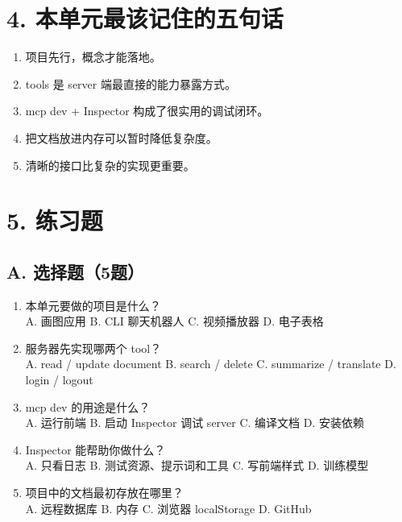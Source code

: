 \documentclass[UTF8,a4paper,11pt]{ctexart}
\begin{document}
\section*{4. 本单元最该记住的五句话}
\begin{enumerate}
  \item 项目先行，概念才能落地。
  \item tools 是 server 端最直接的能力暴露方式。
  \item mcp dev + Inspector 构成了很实用的调试闭环。
  \item 把文档放进内存可以暂时降低复杂度。
  \item 清晰的接口比复杂的实现更重要。
\end{enumerate}

\section*{5. 练习题}
\subsection*{A. 选择题（5题）}
\begin{enumerate}
  \item 本单元要做的项目是什么？\\
  A. 画图应用 \quad B. CLI 聊天机器人 \quad C. 视频播放器 \quad D. 电子表格

  \item 服务器先实现哪两个 tool？\\
  A. read / update document \quad B. search / delete \quad C. summarize / translate \quad D. login / logout

  \item mcp dev 的用途是什么？\\
  A. 运行前端 \quad B. 启动 Inspector 调试 server \quad C. 编译文档 \quad D. 安装依赖

  \item Inspector 能帮助你做什么？\\
  A. 只看日志 \quad B. 测试资源、提示词和工具 \quad C. 写前端样式 \quad D. 训练模型

  \item 项目中的文档最初存放在哪里？\\
  A. 远程数据库 \quad B. 内存 \quad C. 浏览器 localStorage \quad D. GitHub

\end{enumerate}
\end{document}
